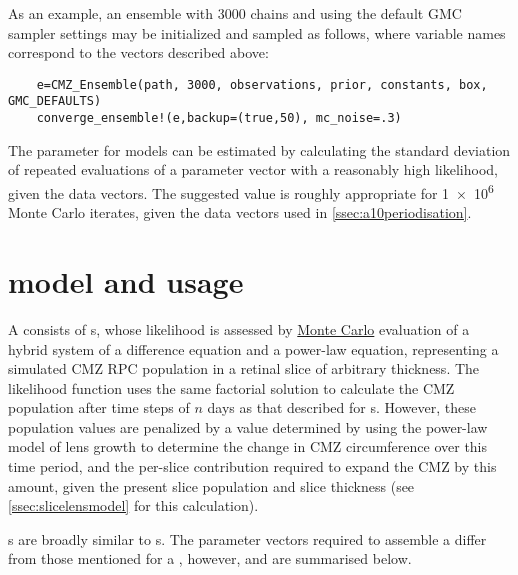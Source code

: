 As an example, an ensemble with 3000 chains and using the default GMC sampler settings may be initialized and sampled as follows, where variable names correspond to the vectors described above:

\begin{verbatim}
    e=CMZ_Ensemble(path, 3000, observations, prior, constants, box, GMC_DEFAULTS)
    converge_ensemble!(e,backup=(true,50), mc_noise=.3)
\end{verbatim}

The  parameter for  models can be estimated by calculating the standard deviation of repeated evaluations of a parameter vector with a reasonably high likelihood, given the data vectors. The suggested value is roughly appropriate for \num{1e6} Monte Carlo iterates, given the data vectors used in \autoref{ssec:a10periodisation}.

\section{\protect{} model and usage}
\label{sec:slicemodel}
A  consists of s, whose likelihood is assessed by \hyperref[ssec:MonteCarlo]{Monte Carlo} evaluation of a hybrid system of a difference equation and a power-law equation, representing a simulated CMZ RPC population in a retinal slice of arbitrary thickness. The  likelihood function uses the same factorial solution to calculate the CMZ population after time steps of $n$ days as that described for s. However, these population values are penalized by a value determined by using the power-law model of lens growth to determine the change in CMZ circumference over this time period, and the per-slice contribution required to expand the CMZ by this amount, given the present slice population and slice thickness (see \autoref{ssec:slicelensmodel} for this calculation).

s are broadly similar to s. The parameter vectors required to assemble a  differ from those mentioned for a , however, and are summarised below. 

